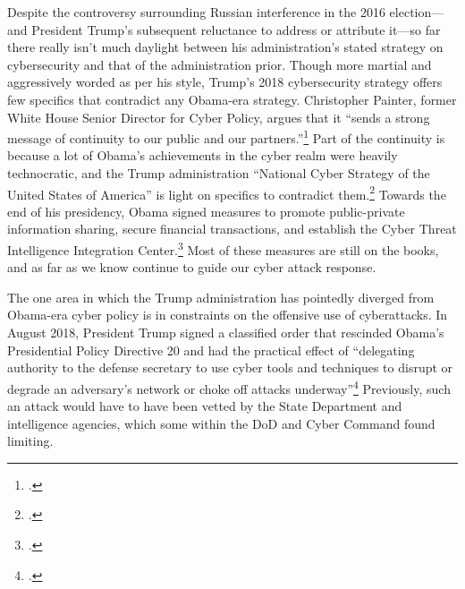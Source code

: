 \documentclass{memoir}
\begin{document}
\begin{refsegment}
Despite the controversy surrounding Russian interference in the 2016 election---and President Trump's subsequent reluctance to address or attribute it---so far there really isn't much daylight between his administration's stated strategy on cybersecurity and that of the administration prior. Though more martial and aggressively worded as per his style, Trump's 2018 cybersecurity strategy offers few specifics that contradict any Obama-era strategy. Christopher Painter, former White House Senior Director for Cyber Policy, argues that it ``sends a strong message of continuity to our public and our partners.''\footcite[Painter also served at the State Department for six years as the Coordinator for Cyber Issues, which at the time was an Assistant Secretary level position. Since then, its status within the department has fluctuated wildly. Rex Tillerson, Trump's first Secretary of State, announced that he would abolish the office and merge it into State's Bureau of Economic Affairs. Then, just a few months later, he proposed creating an entirely new department bureau with a Senate-confirmed Assistant Secretary, possibly in response to criticism of his first decision. Though current Secretary Mike Pompeo appears to have more interest in cyber policy, the State Department still has not reestablished a high level cyber position.]{painter_white_2018} Part of the continuity is because a lot of Obama's achievements in the cyber realm were heavily technocratic, and the Trump administration ``National Cyber Strategy of the United States of America'' is light on specifics to contradict them.\footcite{guest_blogger_white_2018} Towards the end of his presidency, Obama signed measures to promote public-private information sharing, secure financial transactions, and establish the Cyber Threat Intelligence Integration Center.\footcite[Among other actions taken during the Obama presidency, these were sufficenct for PolitiFact to update its 2013 rating of his cyber-enforcement actions to ``Promise Kept.'']{carroll_obama_2016} Most of these measures are still on the books, and as far as we know continue to guide our cyber attack response.

The one area in which the Trump administration has pointedly diverged from Obama-era cyber policy is in constraints on the offensive use of cyberattacks. In August 2018, President Trump signed a classified order that rescinded Obama's Presidential Policy Directive 20 and had the practical effect of ``delegating authority to the defense secretary to use cyber tools and techniques to disrupt or degrade an adversary's network or choke off attacks underway''\footcite{nakashima_trump_2018} Previously, such an attack would have to have been vetted by the State Department and intelligence agencies, which some within the DoD and Cyber Command found limiting.


\end{refsegment}
\end{document}
